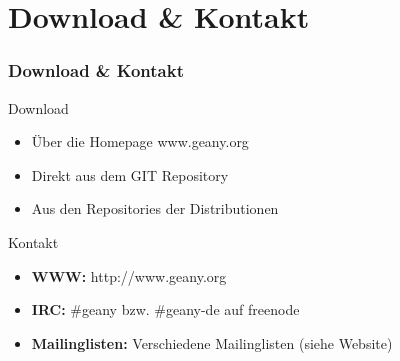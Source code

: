 \section{Download \& Kontakt}
\begin{frame}
	\frametitle{Download \& Kontakt}
	\begin{block}{Download}
		\begin{itemize}
			\item Über die Homepage www.geany.org
			\item Direkt aus dem GIT Repository
			\item Aus den Repositories der Distributionen
		\end{itemize}
	\end{block}
	\begin{block}{Kontakt}
		\begin{itemize}
			\item \textbf{WWW:} http://www.geany.org
			\item \textbf{IRC:} \#geany bzw. \#geany-de auf freenode
			\item \textbf{Mailinglisten:} Verschiedene Mailinglisten (siehe Website)
		\end{itemize}
	\end{block}
\end{frame}
